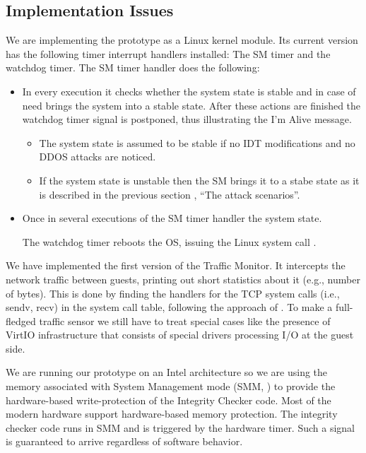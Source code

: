 \subsection{\label{sub:Implementation-Issues}Implementation Issues}

We are implementing the prototype as a Linux kernel module. Its current
version has the following timer interrupt handlers installed: The
SM timer and the watchdog timer. The SM timer handler does the following:
\begin{itemize}
\item In every execution it checks whether the system state is stable and
in case of need brings the system into a stable state. After these
actions are finished the watchdog timer signal is postponed, thus
illustrating the I'm Alive message.

\begin{itemize}
\item The system state is assumed to be stable if no IDT modifications and
no DDOS attacks are noticed.
\item If the system state is unstable then the SM brings it to a stabe state
as it is described in the previous section , ``The attack scenarios''.
\end{itemize}
\item Once in several executions of the SM timer handler the system state.


The watchdog timer reboots the OS, issuing the Linux system call .

\end{itemize}
We have implemented the first version of the Traffic Monitor. It intercepts
the network traffic between guests, printing out short statistics
about it (e.g., number of bytes). This is done by finding the handlers
for the TCP system calls (i.e., \textsf{sendv}, \textsf{recv}) in
the system call table, following the approach of \cite[Section 7]{pfoh-vmmonitor-2013}.
To make a full-fledged traffic sensor we still have to treat special
cases like the presence of VirtIO infrastructure \cite{VirtIO-Russell}
that consists of special drivers processing I/O at the guest side. 

We are running our prototype on an Intel architecture so we are using
the memory associated with System Management mode (SMM, \cite{GMU-CS-TR-Evasion-2011-8})
to provide the hardware-based write-protection of the Integrity Checker
code. Most of the modern hardware support hardware-based memory protection.
The integrity checker code runs in SMM and is triggered by the hardware
timer. Such a signal is guaranteed to arrive regardless of software
behavior. 

